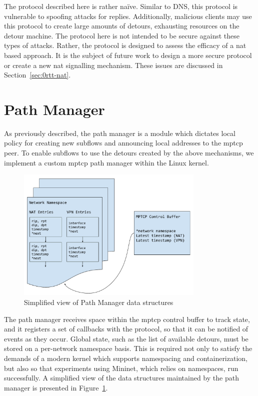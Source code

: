 \documentclass{cwru}
\begin{document}
The protocol described here is rather na\"ive. Similar to DNS, this protocol is
vulnerable to spoofing attacks for replies. Additionally, malicious clients may
use this protocol to create large amounts of detours, exhausting resources on
the detour machine. The protocol here is not intended to be secure against these
types of attacks. Rather, the protocol is designed to assess the efficacy of a
\ac{nat} based approach. It is the subject of future work to design a more
secure protocol or create a new \ac{nat} signalling mechanism. These issues are
discussed in Section~\ref{sec:0rtt-nat}.

\section{Path Manager}

As previously described, the path manager is a module which dictates local
policy for creating new subflows and announcing local addresses to the
\ac{mptcp} peer. To enable subflows to use the detours created by the above
mechanisms, we implement a custom \ac{mptcp} path manager within the Linux
kernel.

\begin{figure}
  \centering
  \includegraphics[width=0.8\textwidth]{figures/KernDataStruct.pdf}
  \caption{Simplified view of Path Manager data structures}
  \label{fig:KernDataStruct}
\end{figure}

The path manager receives space within the \ac{mptcp} control buffer to track
state, and it registers a set of callbacks with the protocol, so that it can be
notified of events as they occur. Global state, such as the list of available
detours, must be stored on a per-network namespace basis. This is required not
only to satisfy the demands of a modern kernel which supports namespacing and
containerization, but also so that experiments using Mininet, which relies on
namespaces, run successfully. A simplified view of the data structures
maintained by the path manager is presented in Figure~\ref{fig:KernDataStruct}.
\end{document}
